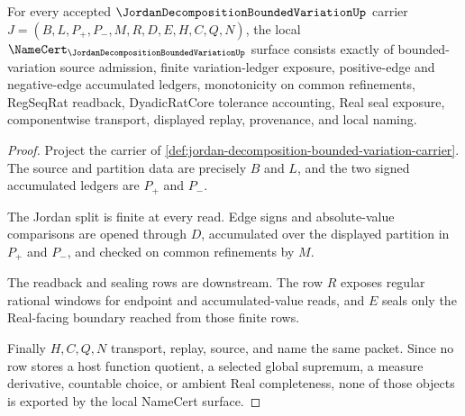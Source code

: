 \begin{theorem}
\label{thm:jordan-decomposition-bounded-variation-namecert-obligations}
For every accepted $\JordanDecompositionBoundedVariationUp$ carrier $J=(B,L,P_{+},P_{-},M,R,D,E,H,C,Q,N)$, the local $\NameCert_{\JordanDecompositionBoundedVariationUp}$ surface consists exactly of bounded-variation source admission, finite variation-ledger exposure, positive-edge and negative-edge accumulated ledgers, monotonicity on common refinements, RegSeqRat readback, DyadicRatCore tolerance accounting, Real seal exposure, componentwise transport, displayed replay, provenance, and local naming.
\end{theorem}
\begin{proof}
Project the carrier of \autoref{def:jordan-decomposition-bounded-variation-carrier}. The source and partition data are precisely $B$ and $L$, and the two signed accumulated ledgers are $P_{+}$ and $P_{-}$.

The Jordan split is finite at every read. Edge signs and absolute-value comparisons are opened through $D$, accumulated over the displayed partition in $P_{+}$ and $P_{-}$, and checked on common refinements by $M$.

The readback and sealing rows are downstream. The row $R$ exposes regular rational windows for endpoint and accumulated-value reads, and $E$ seals only the Real-facing boundary reached from those finite rows.

Finally $H,C,Q,N$ transport, replay, source, and name the same packet. Since no row stores a host function quotient, a selected global supremum, a measure derivative, countable choice, or ambient Real completeness, none of those objects is exported by the local NameCert surface.
\end{proof}

